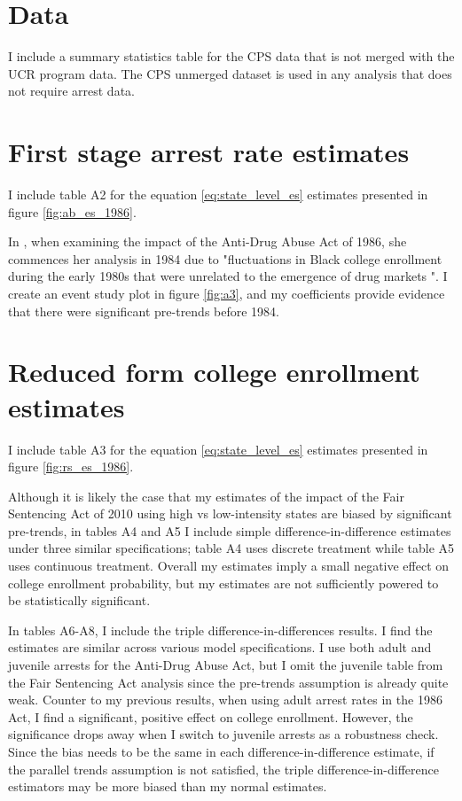 \documentclass{article}
\begin{document}
  \section{Data}
  I include a summary statistics table for the CPS data that is not merged with the UCR program data. The CPS unmerged dataset is used in any analysis that does not require arrest data.

  \section{First stage arrest rate estimates}
  I include table A2 for the equation \ref{eq:state_level_es} estimates presented in figure \ref{fig:ab_es_1986}.

  In \cite{britton2022}, when examining the impact of the Anti-Drug Abuse Act of 1986, she commences her analysis in 1984 due to "fluctuations in Black college enrollment during the early 1980s that were unrelated to the emergence of drug markets \cite{nces}". I create an event study plot in figure \ref{fig:a3}, and my coefficients provide evidence that there were significant pre-trends before 1984.

  \section{Reduced form college enrollment estimates}

  I include table A3 for the equation \ref{eq:state_level_es} estimates presented in figure \ref{fig:rs_es_1986}.

  Although it is likely the case that my estimates of the impact of the Fair Sentencing Act of 2010 using high vs low-intensity states are biased by significant pre-trends, in tables A4 and A5 I include simple difference-in-difference estimates under three similar specifications; table A4 uses discrete treatment while table A5 uses continuous treatment. Overall my estimates imply a small negative effect on college enrollment probability, but my estimates are not sufficiently powered to be statistically significant.

  In tables A6-A8, I include the triple difference-in-differences results. I find the estimates are similar across various model specifications. I use both adult and juvenile arrests for the Anti-Drug Abuse Act, but I omit the juvenile table from the Fair Sentencing Act analysis since the pre-trends assumption is already quite weak. Counter to my previous results, when using adult arrest rates in the 1986 Act, I find a significant, positive effect on college enrollment. However, the significance drops away when I switch to juvenile arrests as a robustness check. Since the bias needs to be the same in each difference-in-difference estimate, if the parallel trends assumption is not satisfied, the triple difference-in-difference estimators may be more biased than my normal estimates.
\end{document}
